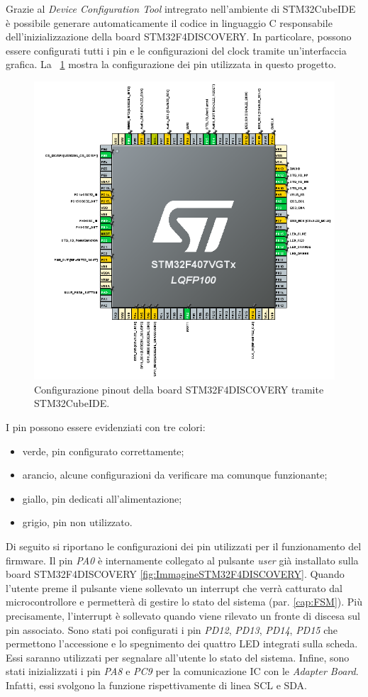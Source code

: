 Grazie al \textit{Device Configuration Tool} intregrato nell'ambiente di STM32CubeIDE è possibile generare automaticamente il codice in linguaggio C responsabile dell'inizializzazione della board STM32F4DISCOVERY. In particolare, possono essere configurati tutti i pin e le configurazioni del clock tramite un'interfaccia grafica. La \Fig~\ref{fig:Pinout} mostra la configurazione dei pin utilizzata in questo progetto. 
\begin{figure}[tbh]
	\centering
	\includegraphics[width=0.9\linewidth]{ImageFiles/Firmware/Pinout}
	\caption[Configurazione pinout della board STM32F4DISCOVERY]{Configurazione pinout della board STM32F4DISCOVERY tramite STM32CubeIDE.}
	\label{fig:Pinout}
\end{figure}
I pin possono essere evidenziati con tre colori:
\begin{itemize}
	\item verde, pin configurato correttamente;
	\item arancio, alcune configurazioni da verificare ma comunque funzionante;
	\item giallo, pin dedicati all'alimentazione;
	\item grigio, pin non utilizzato.
\end{itemize}
Di seguito si riportano le configurazioni dei pin utilizzati per il funzionamento del firmware. Il pin \textit{PA0} è internamente collegato al pulsante \textit{user} già installato sulla board STM32F4DISCOVERY \ref{fig:ImmagineSTM32F4DISCOVERY}. Quando l'utente preme il pulsante viene sollevato un interrupt che verrà catturato dal microcontrollore e permetterà di gestire lo stato del sistema (par. \ref{cap:FSM}). Più precisamente, l'interrupt è sollevato quando viene rilevato un fronte di discesa sul pin associato. Sono stati poi configurati i pin \textit{PD12}, \textit{PD13}, \textit{PD14}, \textit{PD15} che permettono l'accessione e lo spegnimento dei quattro LED integrati sulla scheda. Essi saranno utilizzati per segnalare all'utente lo stato del sistema. Infine, sono stati inizializzati i pin \textit{PA8} e \textit{PC9} per la comunicazione IC con le \textit{Adapter Board}. Infatti, essi svolgono la funzione rispettivamente di linea SCL e SDA.

